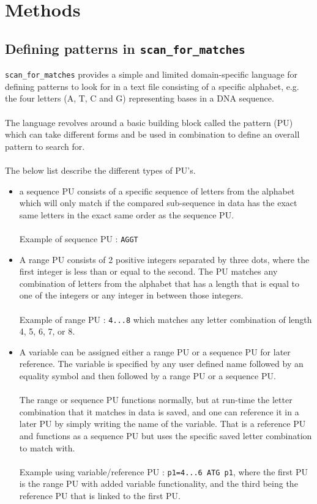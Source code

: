 \documentclass[12pt]{article}
\newcommand{\scm}{\texttt{scan\_for\_matches} }
\newcommand{\pu}{PU }
\newcommand{\pusp}{PU's. }
\newcommand{\pup}{PU. }
\begin{document}
\section{Methods}
\subsection{Defining patterns in \scm}
\scm provides a simple and limited domain-specific language for defining patterns to look for in a text file consisting
of a specific alphabet, e.g. the four letters (A, T, C and G) representing bases in a DNA sequence. \\ \\
The language revolves around a basic building block called the pattern (PU) which can take different forms
and be used in combination to define an overall pattern to search for. \\ \\
The below list describe the different types of \pusp
\begin{itemize}
\item a sequence \pu consists of a specific sequence of letters from the alphabet which will
only match if the compared sub-sequence in data has the exact same letters in the exact same order as the 
sequence PU. \\ \\
Example of sequence \pu : \texttt{AGGT}
\item A range \pu consists of 2 positive integers separated by three dots, where the first integer is less than or
equal to the second. The \pu matches any combination of
letters from the alphabet that has a length that is equal to one of the integers or any integer in between those integers. \\ \\
Example of range \pu : \texttt{4...8} which matches any letter combination of length 4, 5, 6, 7, or 8.
\item A variable can be assigned either a range \pu or a sequence \pu for later reference. The variable is specified by 
any user defined name
followed by an equality symbol and then followed by a range \pu or a sequence \pup \\ \\
The range or sequence PU functions normally, but at run-time the letter combination that it matches
in data is saved, and one can reference it in a later \pu by simply writing the name of the variable. That is a
reference \pu and functions as a sequence \pu but uses the specific saved 
letter combination to match with. \\ \\
Example using variable/reference \pu : \texttt{p1=4...6\; ATG\; p1}, where
the first \pu is the range \pu with added variable functionality, 
and the third being the reference \pu that is linked to the first \pup
\end{itemize}
\end{document}
